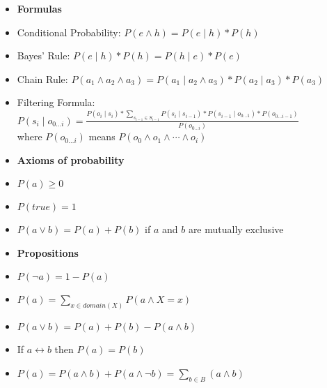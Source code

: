\documentclass[11pt,landscape]{memoir}
\begin{document}
\begin{multicols}{2}

\begin{itemize}
    \item \textbf{Formulas}
    \item Conditional Probability: $P(e \land h) = P(e \mid h) * P(h)$
    \item Bayes' Rule: $P(e \mid h) * P(h) = P(h \mid e) * P(e)$
    \item Chain Rule: $P(a_1 \land a_2 \land a_3) = P(a_1 \mid a_2 \land a_3) * P(a_2 \mid a_3) * P(a_3)$
    \item Filtering Formula: $P(s_i \mid o_{0 \ldots i}) = \frac{P(o_i \mid s_i) * \sum_{s_{i-1} \in S_{i-1}} P(s_i \mid s_{i-1}) * P(s_{i-1} \mid o_{0 \ldots 1}) * P(o_{0 \ldots i-1})}{P(o_{0 \ldots i})}$ \\
        where $P(o_{0 \ldots i})$ means $P(o_0 \land o_1 \land \cdots \land o_i)$
\end{itemize}

\begin{itemize}
    \item \textbf{Axioms of probability}
    \item $P(a) \ge 0$
    \item $P(true) = 1$
    \item $P(a \lor b) = P(a) + P(b)$ if $a$ and $b$ are mutually exclusive
\end{itemize}

\begin{itemize}
    \item \textbf{Propositions}
    \item $P(\lnot a) = 1 - P(a)$
    \item $P(a) = \sum_{x \in domain(X)} P(a \land X = x)$
    \item $P(a \lor b) = P(a) + P(b) - P(a \land b)$
    \item If $a \leftrightarrow b$ then $P(a) = P(b)$
    \item $P(a) = P(a \land b) + P(a \land \lnot b) = \sum_{b \in B}(a \land b)$
\end{itemize}


\end{multicols}
\end{document}

